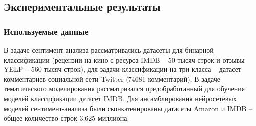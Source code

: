 \subsection{Экспериментальные результаты}
\subsubsection{Используемые данные}
\par
В задаче сентимент-анализа рассматривались датасеты для бинарной классификации (рецензии на кино с ресурса IMDB -- 50 тысяч строк и отзывы YELP -- 560 тысяч строк), для задачи классификации на три класса -- датасет комментариев социальной сети Twitter (74681 комментарий). В задаче тематического моделирования рассматривался предобработанный для обучения моделей классификации датасет IMDB. Для ансамблирования нейросетевых моделей сентимент-анализа были сконкатенированы датасеты Amazon и IMDB -- общее количество строк 3.625 миллиона.
